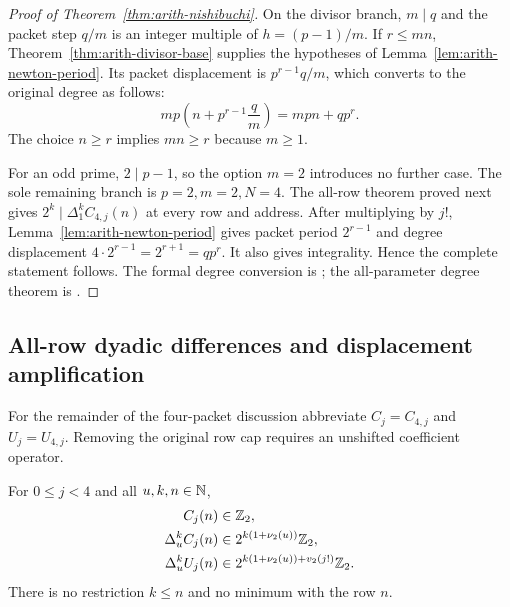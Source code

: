 \begin{proof}[Proof of Theorem~\ref{thm:arith-nishibuchi}]
On the divisor branch, $m\mid q$ and the packet step $q/m$ is an integer
multiple of $h=(p-1)/m$.  If $r\le mn$, Theorem~\ref{thm:arith-divisor-base}
supplies the hypotheses of Lemma~\ref{lem:arith-newton-period}.
Its packet displacement is $p^{r-1}q/m$, which converts to the original
degree as follows:
\[
 mp\left(n+p^{r-1}\frac qm\right)=mpn+qp^r.
\]
The choice $n\ge r$ implies $mn\ge r$ because $m\ge1$.

For an odd prime, $2\mid p-1$, so the option $m=2$ introduces no further
case.  The sole remaining branch is $p=2,m=2,N=4$.  The all-row theorem
proved next gives $2^k\mid\Delta_1^kC_{4,j}(n)$ at every row and address.
After multiplying by $j!$, Lemma~\ref{lem:arith-newton-period} gives packet
period $2^{r-1}$ and degree displacement $4\cdot2^{r-1}=2^{r+1}=qp^r$.
It also gives integrality.  Hence the complete statement follows.
The formal degree conversion is
;
the all-parameter degree theorem is
.
\end{proof}

\subsection{All-row dyadic differences and displacement amplification}

For the remainder of the four-packet discussion abbreviate
$C_j=C_{4,j}$ and $U_j=U_{4,j}$.  Removing the original row cap requires
an unshifted coefficient operator.

\begin{theorem}\label{thm:arith-dyadic-differences}
For $0\le j<4$ and all $u,k,n\in\mathbb N$,
\begin{align}
 C_j(n)&\in\mathbb Z_2,\\
 \Delta_u^kC_j(n)&\in 2^{k(1+\nu_2(u))}\mathbb Z_2,\label{eq:arith-allrow-c}\\
 \Delta_u^kU_j(n)&\in
 2^{k(1+\nu_2(u))+v_2(j!)}\mathbb Z_2.\label{eq:arith-allrow-u}
\end{align}
There is no restriction $k\le n$ and no minimum with the row $n$.
\end{theorem}

